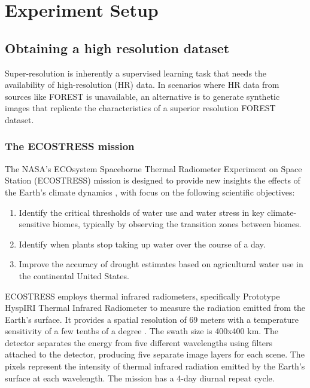 \section{Experiment Setup}

    \subsection{Obtaining a high resolution dataset}
    
    
        Super-resolution is inherently a supervised learning task that needs the availability of high-resolution (HR) data. In scenarios where HR data from sources like FOREST is unavailable, an alternative is to generate synthetic images that replicate the characteristics of a superior resolution FOREST dataset.

        \subsubsection{The ECOSTRESS mission}
    
        The NASA's ECOsystem Spaceborne Thermal Radiometer Experiment on Space Station (ECOSTRESS) mission is designed to provide new insights the effects of the Earth's climate dynamics \cite{ECOSTRESS2023}, with focus on the following scientific objectives:

        \begin{enumerate}
            \item Identify the critical thresholds of water use and water stress in key climate-sensitive biomes, typically by observing the transition zones between biomes.
            \item Identify when plants stop taking up water over the course of a day.
            \item Improve the accuracy of drought estimates based on agricultural water use in the continental United States. 
        \end{enumerate}

        ECOSTRESS employs thermal infrared radiometers, specifically Prototype HyspIRI Thermal Infrared Radiometer \cite{PhyTIR2023} to measure the radiation emitted from the Earth's surface. It provides a spatial resolution of 69 meters with a temperature sensitivity of a few tenths of a degree \cite{ECOSTRESS2023}.  The swath size is 400x400 km. The detector separates the energy from five different wavelengths using filters attached to the detector, producing five separate image layers for each scene. The pixels represent the intensity of thermal infrared radiation emitted by the Earth's surface at each wavelength. The mission has a 4-day diurnal repeat cycle.
    
